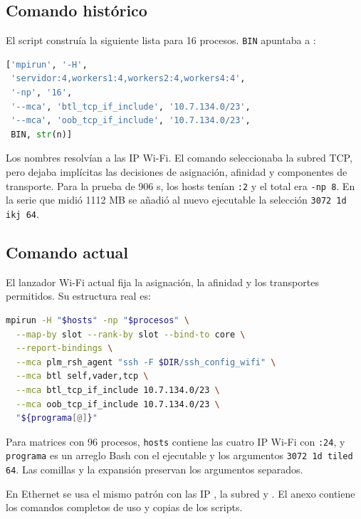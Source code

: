 \subsection{Comando histórico}
El script  construía la siguiente lista para 16 procesos. \texttt{BIN} apuntaba a :
\begin{lstlisting}[language=Python]
['mpirun', '-H',
 'servidor:4,workers1:4,workers2:4,workers4:4',
 '-np', '16',
 '--mca', 'btl_tcp_if_include', '10.7.134.0/23',
 '--mca', 'oob_tcp_if_include', '10.7.134.0/23',
 BIN, str(n)]
\end{lstlisting}
Los nombres resolvían a las IP Wi-Fi. El comando seleccionaba la subred TCP, pero dejaba implícitas las decisiones de asignación, afinidad y componentes de transporte. Para la prueba de 906 s, los hosts tenían \texttt{:2} y el total era \texttt{-np 8}. En la serie que midió 1112 MB se añadió al nuevo ejecutable la selección \texttt{3072 1d ikj 64}.

\subsection{Comando actual}
El lanzador Wi-Fi actual fija la asignación, la afinidad y los transportes permitidos. Su estructura real es:
\begin{lstlisting}[language=bash]
mpirun -H "$hosts" -np "$procesos" \
  --map-by slot --rank-by slot --bind-to core \
  --report-bindings \
  --mca plm_rsh_agent "ssh -F $DIR/ssh_config_wifi" \
  --mca btl self,vader,tcp \
  --mca btl_tcp_if_include 10.7.134.0/23 \
  --mca oob_tcp_if_include 10.7.134.0/23 \
  "${programa[@]}"
\end{lstlisting}
Para matrices con 96 procesos, \texttt{hosts} contiene las cuatro IP Wi-Fi con \texttt{:24}, y \texttt{programa} es un arreglo Bash con el ejecutable y los argumentos \texttt{3072 1d tiled 64}. Las comillas y la expansión  preservan los argumentos separados.

En Ethernet se usa el mismo patrón con las IP , la subred  y . El anexo contiene los comandos completos de uso y copias de los scripts.

\clearpage
